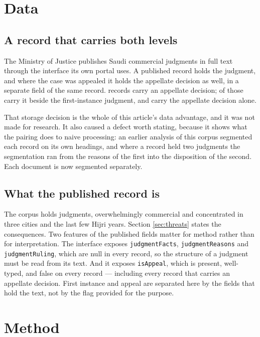 \documentclass[11pt]{article}
\begin{document}
\section{Data}
\label{sec:data}

\subsection{A record that carries both levels}

The Ministry of Justice publishes Saudi commercial judgments in full text
through the interface its own portal uses. A published record holds the
judgment, and where the case was appealed it holds the appellate decision as
well, in a separate field of the same record. \nAppeals{} records carry an
appellate decision; \nPaired{} of those carry it beside the first-instance
judgment, and \nAppealOnly{} carry the appellate decision alone.

That storage decision is the whole of this article's data advantage, and it
was not made for research. It also caused a defect worth stating, because it
shows what the pairing does to naive processing: an earlier analysis of this
corpus segmented each record on its own headings, and where a record held two
judgments the segmentation ran from the reasons of the first into the
disposition of the second. Each document is now segmented separately.

\subsection{What the published record is}

The corpus holds \nJudgments{} judgments, overwhelmingly commercial and
concentrated in three cities and the last few Hijri years. Section
\ref{sec:threats} states the consequences. Two features of the published
fields matter for method rather than for interpretation. The interface
exposes \texttt{judgmentFacts}, \texttt{judgmentReasons} and
\texttt{judgmentRuling}, which are null in every record, so the structure of a
judgment must be read from its text. And it exposes \texttt{isAppeal}, which
is present, well-typed, and false on every record --- including every record
that carries an appellate decision. First instance and appeal are separated
here by the fields that hold the text, not by the flag provided for the
purpose.

\section{Method}
\label{sec:method}
\end{document}
